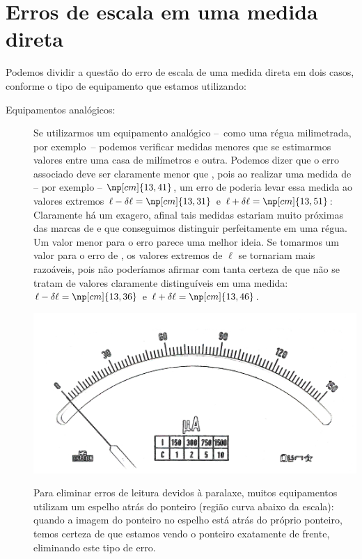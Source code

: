 \section{Erros de escala em uma medida direta}

Podemos dividir a questão do erro de escala de uma medida direta em dois casos, conforme o tipo de equipamento que estamos utilizando:
\begin{description}
	\item[Equipamentos analógicos:] Se utilizarmos um equipamento analógico --~como uma régua milimetrada, por exemplo~-- podemos verificar medidas menores que  se estimarmos valores entre uma casa de milímetros e outra. Podemos dizer que o erro associado deve ser claramente menor que , pois ao realizar uma medida de -- por exemplo -- $\np[cm]{13,41}$, um erro de  poderia levar essa medida ao valores extremos $\ell - \delta\ell = \np[cm]{13,31}$ e $\ell+\delta\ell = \np[cm]{13,51}$: Claramente há um exagero, afinal tais medidas estariam muito próximas das marcas de  e  que conseguimos distinguir perfeitamente em uma régua. Um valor menor para o erro parece uma melhor ideia. Se tomarmos um valor para o erro de , os valores extremos de $\ell$ se tornariam mais razoáveis, pois não poderíamos afirmar com tanta certeza de que não se tratam de valores claramente distinguíveis em uma medida: $\ell - \delta\ell = \np[cm]{13,36}$ e $\ell+\delta\ell = \np[cm]{13,46}$.

\begin{marginfigure}
	\includegraphics[width=\textwidth]{Ilustrations/AmperimetroAnalogEspelho.png}
	\caption{Para eliminar erros de leitura devidos à paralaxe, muitos equipamentos utilizam um espelho atrás do ponteiro (região curva abaixo da escala): quando a imagem do ponteiro no espelho está atrás do próprio ponteiro, temos certeza de que estamos vendo o ponteiro exatamente de frente, eliminando este tipo de erro.}
\end{marginfigure}


\end{description}
